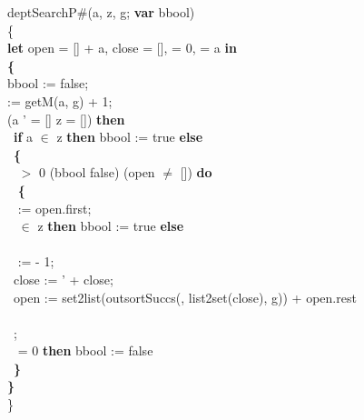 deptSearchP\#(a, z, g; {\bf var} bbool) \\
\{\\
{\bf let} open = [] + a, close = [],  = 0,  = a {\bf in}\\
{\bf \{}\\
\tabbe bbool := false;\\
\tabbe {} := getM(a, g) + 1;\\
 \Not (a ' = [] \Or z = []) {\bf then}\\
\tabbe \tabif\  {\bf if} a $\in$ z {\bf then} bbool := true {\bf else}\\
\tabbe \tabif\  {\bf \{}\\
\tabbe \tabif\   $>$ 0 \And (bbool \Equiv false) \And (open $\neq$ []) {\bf do}\\
\tabbe \tabif\ \tabbe {} {\bf \{}\\
\tabbe \tabif\ \tabbe {}\tabbe {} := open.first;\\
\tabbe \tabif\ \tabbe {}  $\in$ z {\bf then} bbool := true {\bf else}\\
\tabbe \tabif\ \tabbe {}\tabbe  {\bf \{}\\
\tabbe \tabif\ \tabbe {}\tabbe \tabbe {} :=  - 1;\\
\tabbe \tabif\ \tabbe {}\tabbe \tabbe close :=  ' + close;\\
\tabbe \tabif\ \tabbe {}\tabbe \tabbe open := set2list(outsortSuccs(, list2set(close), g)) + open.rest\\
\tabbe \tabif\ \tabbe {}\tabbe {\bf \}}\\
\tabbe \tabif\ \tabbe {};\\
\tabbe \tabif\   = 0 {\bf then} bbool := false\\
\tabbe \tabif\ {\bf \}}\\
{\bf \}}\\
\}

\bigskip



\par\mbox{}\hrulefill\mbox{}\par